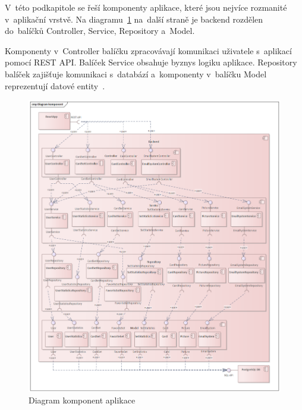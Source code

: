 \documentclass[twoside]{ctuthesis}
\begin{document}
V~této podkapitole se řeší komponenty aplikace, které jsou nejvíce rozmanité v~aplikační vrstvě. Na diagramu~\ref{fig:cd} na~další straně je backend rozdělen do~balíčků Controller, Service, Repository a~Model.

Komponenty v~Controller balíčku zpracovávají komunikaci uživatele s~aplikací pomocí REST API. Balíček Service obsahuje byznys logiku aplikace. Repository balíček zajišťuje komunikaci s~databází a~komponenty v~balíčku Model reprezentují datové entity~\cite{csrm}.

\newpage

\begin{figure}[H]
\includegraphics[width=1.4\textwidth, height=1.72\textwidth, center]{Diagram komponent.png}
\caption{Diagram komponent aplikace}
\label{fig:cd}
\end{figure}
\end{document}
